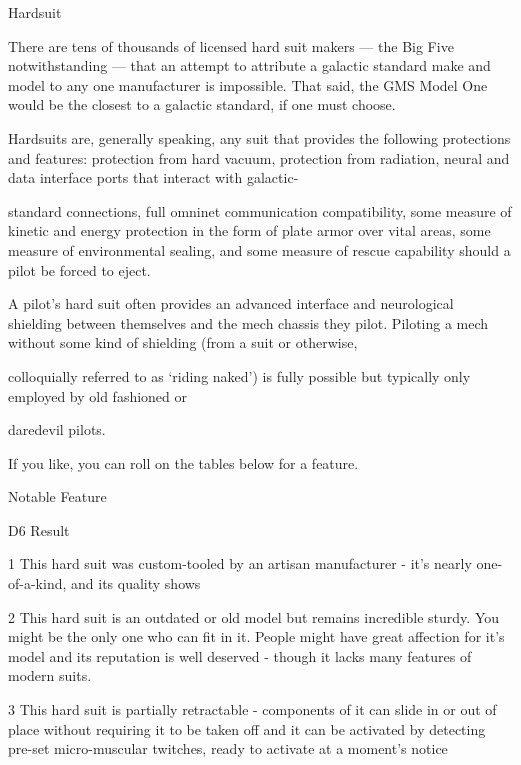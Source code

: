                                                                                                                        


                                                         Hardsuit  

There are tens of thousands of licensed hard suit makers — the Big Five notwithstanding — that an attempt  
to attribute a galactic standard make and model to any one manufacturer is impossible. That said, the GMS  
Model One would be the closest to a galactic standard, if one must choose.   

Hardsuits are, generally speaking, any suit that provides the following protections and features: protection  
from hard vacuum, protection from radiation, neural and data interface ports that interact with galactic- 

standard connections, full omninet communication compatibility, some measure of kinetic and energy  
protection in the form of plate armor over vital areas, some measure of environmental sealing, and some  
measure of rescue capability should a pilot be forced to eject.   

A pilot’s hard suit often provides an advanced interface and neurological shielding between themselves and  
the mech chassis they pilot. Piloting a mech without some kind of shielding (from a suit or otherwise,  

colloquially referred to as ‘riding naked’) is fully possible but typically only employed by old fashioned or  

daredevil pilots.   

If you like, you can roll on the tables below for a feature.
 

                                                       Notable Feature
 

  D6     Result 

  1      This hard suit was custom-tooled by an artisan manufacturer - it’s nearly one-of-a-kind, and its quality shows 

  2      This hard suit is an outdated or old model but remains incredible sturdy. You might be the only one who can  
         fit in it. People might have great affection for it’s model and its reputation is well deserved - though it lacks  
         many features of modern suits. 

  3      This hard suit is partially retractable - components of it can slide in or out of place without requiring it to be  
         taken off and it can be activated by detecting pre-set micro-muscular twitches, ready to activate at a  
         moment’s notice 


